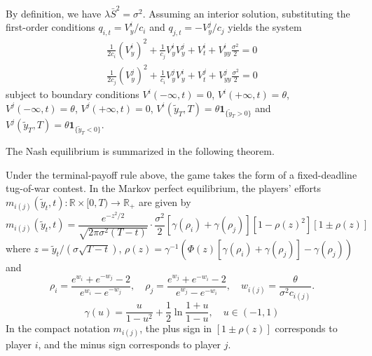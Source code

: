\documentclass[mnsc]{informs3}
\begin{document}
By definition, we have $\lambda \bar{S}^2 = \sigma^2$.
Assuming an interior solution, substituting the first-order conditions $q_{i,t} = V^i_y/c_i$ and $q_{j,t} = -V^j_y/c_j$ yields the system
\begin{equation*}
\begin{aligned}
\frac{1}{2c_i}(V^i_y)^2 + \frac{1}{c_j}V^i_yV^j_y + V^i_t + V^i_{yy}\frac{\sigma^2}{2} = 0\\
\frac{1}{2c_j}(V^j_y)^2 + \frac{1}{c_i}V^j_yV^i_y + V^j_t + V^j_{yy}\frac{\sigma^2}{2} = 0
\end{aligned}
\end{equation*}
subject to boundary conditions $V^i(-\infty, t) = 0$, $V^i(+\infty, t) = \theta$, $V^j(-\infty, t) = \theta$, $V^j(+\infty, t)=0$, $V^i(\tilde{y}_T, T) = \theta \mathbf 1_{\{\tilde y_T>0\}}$ and $V^j(\tilde{y}_T, T) = \theta \mathbf 1_{\{\tilde y_T<0\}}$.


The Nash equilibrium is summarized in the following theorem.

\begin{theorem}\label{thm-equilibrium-effort}
Under the terminal-payoff rule above, the game takes the form of a fixed-deadline tug-of-war contest.
In the Markov perfect equilibrium, the players’ efforts $m_{i(j)}(\tilde{y}_t, t) :\mathbb{R}\times[0, T)\to\mathbb{R}_+$ are given by
\begin{equation}\label{eq-equilibrium-effort}
m_{i(j)}(\tilde{y}_t, t) = \frac{e^{-z^2/2}}{\sqrt{2\pi\sigma^2(T-t)}}\cdot \frac{\sigma^2}{2}\left[\gamma(\rho_{i}) + \gamma(\rho_{j})\right]\left[1-\rho(z)^2\right]\left[1 \pm \rho(z)\right]
\end{equation}
where $z = \tilde{y}_t / (\sigma\sqrt{T-t})$, $\rho(z) = \gamma^{-1}\left(\Phi(z)\left[\gamma(\rho_{i})+\gamma(\rho_{j})\right]-\gamma(\rho_{j})\right)$ and
\begin{equation*}
\rho_{i} = \frac{e^{w_{i}}+e^{-w_{j}}-2}{e^{w_{i}}-e^{-w_{j}}},
\quad
\rho_{j} = \frac{e^{w_{j}}+e^{-w_{i}}-2}{e^{w_{j}}-e^{-w_{i}}},
\quad
w_{i(j)} = \frac{\theta}{\sigma^2 c_{i(j)}}.
\end{equation*}
\begin{equation}\label{eq-gamma}
\gamma(u) = \frac{u}{1-u^2} + \frac{1}{2}\ln\frac{1+u}{1-u},\quad u\in(-1,1)
\end{equation}
In the compact notation $m_{i(j)}$, the plus sign in $[1\pm\rho(z)]$ corresponds to player $i$, and the minus sign corresponds to player $j$.
\end{theorem}
\end{document}
